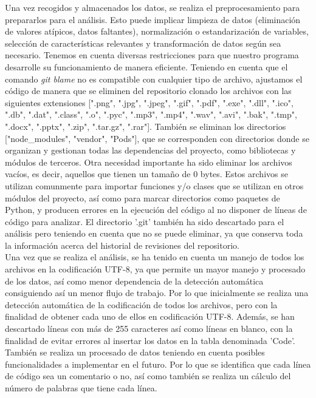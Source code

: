 \documentclass[a4paper, 12pt]{book}
\begin{document}
Una vez recogidos y almacenados los datos, se realiza el preprocesamiento para prepararlos para el análisis. Esto puede implicar limpieza de datos (eliminación de valores atípicos, datos faltantes), normalización o estandarización de variables, selección de características relevantes y
transformación de datos según sea necesario.
Tenemos en cuenta diversas restricciones para que nuestro programa desarrolle su funcionamiento de manera eficiente. Teniendo en cuenta que el comando \textit{git blame} no es compatible con cualquier tipo de archivo, ajustamos el código
de manera que se eliminen del repositorio clonado los archivos con las siguientes extensiones [".png", ".jpg", ".jpeg", ".gif", ".pdf", ".exe", ".dll", ".ico", ".db", ".dat", ".class", ".o", ".pyc", ".mp3", ".mp4", ".wav", ".avi", ".bak", ".tmp", ".docx", ".pptx", ".zip",
".tar.gz", ".rar"]. También se eliminan los directorios ["node\_modules", "vendor", "Pods"], que se corresponden con directorios donde se organizan y gestionan todas las dependencias del proyecto, como bibliotecas y módulos de terceros. Otra necesidad importante ha sido
eliminar los archivos vacíos, es decir, aquellos que tienen un tamaño de 0 bytes. Estos archivos se utilizan comunmente para importar funciones y/o clases que se utilizan en otros módulos del proyecto, así como para marcar directorios como paquetes de Python, y producen errores
en la ejecución del código al no disponer de líneas de código para analizar. El directorio '.git' también ha sido descartado para el análisis pero teniendo en cuenta que no se puede eliminar, ya que conserva toda la información acerca del historial de revisiones del repositorio.
\\Una vez que se realiza el análisis, se ha tenido en cuenta un manejo de todos los archivos en la codificación UTF-8, ya que permite un mayor manejo y procesado de los datos, así como menor dependencia de la detección automática consiguiendo así un menor flujo de trabajo.
Por lo que inicialmente se realiza una detección automática de la codificación de todos los archivos, pero con la finalidad de obtener cada uno de ellos en codificación UTF-8. Además, se han descartado líneas con más de 255 caracteres así como líneas en blanco, con la finalidad
de evitar errores al insertar los datos en la tabla denominada 'Code'. 
\\También se realiza un procesado de datos teniendo en cuenta posibles funcionalidades a implementar en el futuro. Por lo que se identifica que cada línea de código sea un comentario o no, así como también se realiza un cálculo del número de palabras que tiene cada línea.
\end{document}
